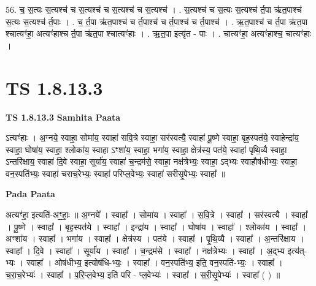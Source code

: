 \documentclass[17pt]{extarticle}
\begin{document}
56. च॒ स॒त्यः स॒त्यश्च॑ च स॒त्यश्च॑ च स॒त्यश्च॑ च स॒त्यश्च॑ । . स॒त्यश्च॑ च स॒त्यः स॒त्यश्च॑ र्त॒पा ऋ॑त॒पाश्च॑ स॒त्यः स॒त्यश्च॑ र्त॒पाः । . च॒ र्त॒पा ऋ॑त॒पाश्च॑ च र्त॒पाश्च॑ च र्त॒पाश्च॑ च र्त॒पाश्च॑ । . ऋ॒त॒पाश्च॑ च र्त॒पा ऋ॑त॒पा श्चात्यꣳ॑हा॒ अत्यꣳ॑हाश्च र्त॒पा ऋ॑त॒पा श्चात्यꣳ॑हाः । . ऋ॒त॒पा इत्यृ॑त - पाः । . चात्यꣳ॑हा॒ अत्यꣳ॑हाश्च॒ चात्यꣳ॑हाः । \newline
\pagebreak
{}
\section*{ TS 1.8.13.3 }

\textbf{TS 1.8.13.3 } \newline
\textbf{Samhita Paata} \newline

ऽत्यꣳ॑हाः । अ॒ग्नये॒ स्वाहा॒ सोमा॑य॒ स्वाहा॑ सवि॒त्रे स्वाहा॒ सर॑स्वत्यै॒ स्वाहा॑ पू॒ष्णे स्वाहा॒ बृह॒स्पत॑ये॒ स्वाहेन्द्रा॑य॒ स्वाहा॒ घोषा॑य॒ स्वाहा॒ श्लोका॑य॒ स्वाहा ऽꣳशा॑य॒ स्वाहा॒ भगा॑य॒ स्वाहा॒ क्षेत्र॑स्य॒ पत॑ये॒ स्वाहा॑ पृथि॒व्यै स्वाहा॒ ऽन्तरि॑क्षाय॒ स्वाहा॑ दि॒वे स्वाहा॒ सूर्या॑य॒ स्वाहा॑ च॒न्द्रम॑से॒ स्वाहा॒ नक्ष॑त्रेभ्यः॒ स्वाहा॒ ऽद्भ्यः स्वाहौष॑धीभ्यः॒ स्वाहा॒ वन॒स्पति॑भ्यः॒ स्वाहा॑ चराच॒रेभ्यः॒ स्वाहा॑ परिप्ल॒वेभ्यः॒ स्वाहा॑ सरीसृ॒पेभ्यः॒ स्वाहा᳚ ॥ \newline

\textbf{Pada Paata} \newline

अत्यꣳ॑हा॒ इत्यति॑-अꣳ॒॒हाः॒ ॥ अ॒ग्नये᳚ । स्वाहा᳚ । सोमा॑य । स्वाहा᳚ । स॒वि॒त्रे । स्वाहा᳚ । सर॑स्वत्यै । स्वाहा᳚ । पू॒ष्णे । स्वाहा᳚ । बृह॒स्पत॑ये । स्वाहा᳚ । इन्द्रा॑य । स्वाहा᳚ । घोषा॑य । स्वाहा᳚ । श्लोका॑य । स्वाहा᳚ । अꣳशा॑य । स्वाहा᳚ । भगा॑य । स्वाहा᳚ । क्षेत्र॑स्य । पत॑ये । स्वाहा᳚ । पृ॒थि॒व्यै । स्वाहा᳚ । अ॒न्तरि॑क्षाय । स्वाहा᳚ । दि॒वे । स्वाहा᳚ । सूर्या॑य । स्वाहा᳚ । च॒न्द्रम॑से । स्वाहा᳚ । नक्ष॑त्रेभ्यः । स्वाहा᳚ । अ॒द्भ्य इत्य॑त्-भ्यः । स्वाहा᳚ । ओष॑धीभ्य॒ इत्योष॑धि-भ्यः॒ । स्वाहा᳚ । वन॒स्पति॑भ्य॒ इति॒ वन॒स्पति॑-भ्यः॒ । स्वाहा᳚ । च॒रा॒च॒रेभ्यः॑ । स्वाहा᳚ । प॒रि॒प्ल॒वेभ्य॒ इति॑ परि - प्ल॒वेभ्यः॑ । स्वाहा᳚ । स॒री॒सृ॒पेभ्यः॑ । स्वाहा᳚ ( ) ॥  \newline
\end{document}
